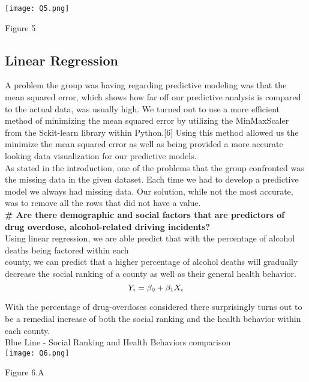 \documentclass[conference]{IEEEtran}
\begin{document}
 \texttt{[image: Q5.png]}
\begin{center}
\footnotesize{Figure 5}
\end{center}


\subsection{Linear Regression}

A problem the group was having regarding predictive modeling was that
the mean squared error, which shows how far off our predictive analysis is compared to the actual data, was usually high. We turned out to use a more efficient method of minimizing the mean squared error by utilizing the MinMaxScaler from the Sckit-learn library within Python.[6] Using this method allowed us the minimize the mean squared error as well as being provided a more accurate looking data visualization for our predictive models.\\

As stated in the introduction, one of the problems that the group confronted was
the missing data in the given dataset. Each time we had to develop a predictive model
we always had missing data. Our solution, while not the most accurate, was to remove
all the rows that did not have a value.\\

\textbf{# Are there demographic and social factors that are predictors of drug
overdose, alcohol-related driving incidents?}\\

Using linear regression, we are able predict that with the percentage of alcohol deaths being factored within each\\ county, we can predict that a higher percentage of alcohol deaths will gradually decrease the social ranking of a county as well as their general health behavior.
\begin{equation}
\boldmath{
Y_i = \beta_0 + \beta_1 X_i}
\end{equation}



With the percentage of drug-overdoses considered there surprisingly turns out to be a remedial increase of both the social ranking and the health behavior within each county.\\

Blue Line - Social Ranking and Health Behaviors comparison\\

 \texttt{[image: Q6.png]}
\begin{center}
\footnotesize{Figure 6.A}
\end{center}
\end{document}

